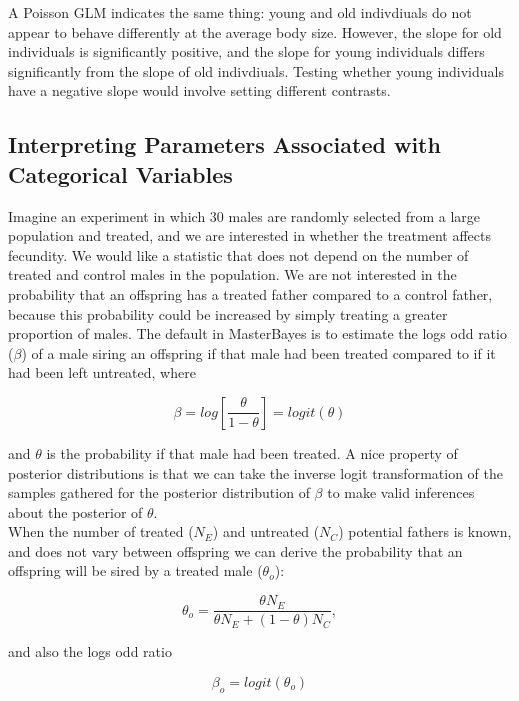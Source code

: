 \documentclass{article}
\begin{document}
A Poisson GLM indicates the same thing: young and old indivdiuals do not appear to behave differently at the average body size.  However, the slope for old individuals is significantly positive, and the slope for young individuals differs significantly from the slope of old indivdiuals. Testing whether young individuals have a negative slope would involve setting different contrasts. 

\subsection{Interpreting Parameters Associated with Categorical Variables}

Imagine an experiment in which 30 males are randomly selected from a large population and treated, and we are interested in whether the treatment affects fecundity.  We would like a statistic that does not depend on the number of treated and control males in the population.  We are not interested in the probability that an offspring has a treated father compared to a control father, because this probability could be increased by simply treating a greater proportion of males.  The default in MasterBayes is to estimate the logs odd ratio ($\beta$) of a male siring an offspring if that male had been treated compared to if it had been left untreated, where

\begin{equation}
\beta  = log\left[\frac{\theta}{1-\theta}\right] = logit(\theta)
\end{equation}

and $\theta$ is the probability if that male had been treated. A nice property of posterior distributions is that we can take the inverse logit transformation of the samples gathered for the posterior distribution of $\beta$ to make valid inferences about the posterior of $\theta$.\\

When the number of treated ($N_{E}$) and untreated ($N_{C}$) potential fathers is known, and does not vary between offspring we can derive the probability that an offspring will be sired by a treated male ($\theta_{o}$):

\begin{equation}
\theta_{o}  = \frac{\theta N_{E}}{\theta N_{E} + (1-\theta)N_{C}},  
\label{eq_thetao}
\end{equation}

and also the logs odd ratio

\begin{equation}
\beta_{o}  = logit(\theta_{o})
\end{equation}
\end{document}
